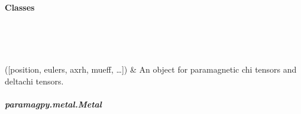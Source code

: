 \documentclass[a4paper,10pt,english,openany,oneside]{sphinxmanual}
\begin{document}
\paragraph{Classes}
\label{\detokenize{reference/metal:classes}}

\begin{savenotes}\sphinxatlongtablestart\begin{longtable}[c]{}
\hline

\endfirsthead

%
{}\\
\hline

\endhead

\hline
{}\\
\endfoot

\endlastfoot

\sphinxAtStartPar
{\hyperref[\detokenize{reference/generated/paramagpy.metal.Metal:paramagpy.metal.Metal}]{}}({[}position, eulers, axrh, mueff, …{]})
&
\sphinxAtStartPar
An object for paramagnetic chi tensors and delta\sphinxhyphen{}chi tensors.
\\
\hline
\end{longtable}\sphinxatlongtableend\end{savenotes}


\subparagraph{paramagpy.metal.Metal}
\label{\detokenize{reference/generated/paramagpy.metal.Metal:paramagpy-metal-metal}}\label{\detokenize{reference/generated/paramagpy.metal.Metal::doc}}
\end{document}
